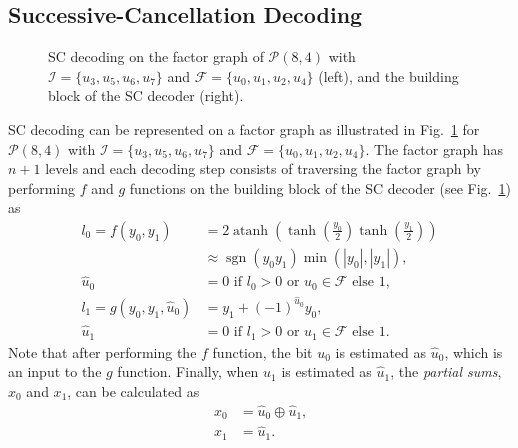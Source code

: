 \documentclass[conference]{IEEEtran}
\DeclareMathOperator{\sgn}{sgn}
\DeclareMathOperator*{\atanh}{atanh}
\begin{document}
%    

\subsection{Successive-Cancellation Decoding}

\begin{figure}
    \centering
    
    
    \caption{SC decoding on the factor graph of $\mathcal{P}(8,4)$ with $\mathcal{I} = \{u_3,u_5,u_6,u_7\}$ and $\mathcal{F} = \{u_0,u_1,u_2,u_4\}$ (left), and the building block of the SC decoder (right).}
    \label{fig:decGraph}
\end{figure}

SC decoding can be represented on a factor graph as illustrated in Fig.~\ref{fig:decGraph} for $\mathcal{P}(8,4)$ with $\mathcal{I} = \{u_3,u_5,u_6,u_7\}$ and $\mathcal{F} = \{u_0,u_1,u_2,u_4\}$. The factor graph has $n+1$ levels and each decoding step consists of traversing the factor graph by performing $f$ and $g$ functions on the building block of the SC decoder (see Fig.~\ref{fig:decGraph}) as
\begin{align}
    l_0 = f(y_0,y_1) &= 2 \atanh\left(\tanh\left(\frac{y_0}{2}\right)\tanh\left(\frac{y_1}{2}\right)\right) \\
    &\approx \sgn(y_0y_1)\min(|y_0|,|y_1|) \text{,} \label{eq:fFunction} \\
    \hat{u}_0 &= 0 \text{ if } l_0>0 \text{ or } u_0\in\mathcal{F} \text{ else } 1 \text{,} \label{eq:fu0} \\
    l_1 = g(y_0,y_1,\hat{u}_0) &= y_1 + (-1)^{\hat{u}_0}y_0 \text{,} \label{eq:gFunction} \\
    \hat{u}_1 &= 0 \text{ if } l_1>0 \text{ or } u_1\in\mathcal{F} \text{ else } 1 \text{.} \label{eq:gu1}
\end{align}
Note that after performing the $f$ function, the bit $u_0$ is estimated as $\hat{u}_0$, which is an input to the $g$ function. Finally, when $u_1$ is estimated as $\hat{u}_1$, the \emph{partial sums}, $x_0$ and $x_1$, can be calculated as
\begin{align}
    x_0 &= \hat{u}_0 \oplus \hat{u}_1 \text{,} \label{eq:x0} \\
    x_1 &= \hat{u}_1 \text{.} \label{eq:x1}
\end{align}
\end{document}
